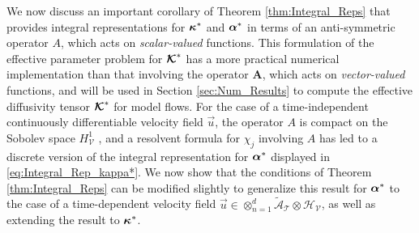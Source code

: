 \documentclass[11pt]{amsart}
\newcommand{\Ab}{\mathbf{A}}
\newcommand\Kbc{\mbox{\boldmath${\mathcal{K}}$}}
\newcommand{\Tc}{\mathcal{T}}
\newcommand{\Vc}{\mathcal{V}}
\newcommand{\Hc}{\mathcal{H}}
\newcommand{\As}{\mathscr{A}}
\newcommand\balpha{\mbox{\boldmath${\alpha}$}}
\newcommand\bkappa{\mbox{\boldmath${\kappa}$}}
\begin{document}
We now discuss an important corollary of Theorem
\ref{thm:Integral_Reps} that provides integral
representations for $\bkappa^*$ and $\balpha^*$ in terms of an
anti-symmetric operator $A$, which acts on \emph{scalar-valued}
functions. This formulation
\cite{Pavliotis:PHD_Thesis,Bhattacharya:AAP:1999:951} of the effective
parameter problem for $\Kbc^*$ has a more practical numerical
implementation than that involving the operator $\Ab$, which acts on
\emph{vector-valued} functions, and will be used in Section
\ref{sec:Num_Results} to compute the effective diffusivity tensor
$\Kbc^*$ for model flows. For the case of a time-independent
continuously differentiable velocity field $\vec{u}$, the operator $A$
is compact on the Sobolev space $H^1_{\Vc}$
\cite{Bhattacharya:AAP:1999:951}, and a resolvent formula for $\chi_j$
involving $A$ has led to \cite{Pavliotis:PHD_Thesis} a discrete 
version of the integral representation for $\balpha^*$ displayed in 
\eqref{eq:Integral_Rep_kappa*}. We now show that the conditions of
Theorem \ref{thm:Integral_Reps} can be modified slightly to generalize
this result for $\balpha^*$ to the case of a time-dependent velocity
field $\vec{u}\in\otimes_{n=1}^d\tilde{\As}_{\Tc}\otimes\Hc_{\Vc}$, as well as
extending the result to $\bkappa^*$.     
\end{document}
